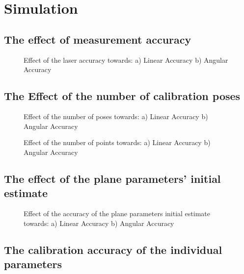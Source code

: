 \section{Simulation}
\label{sec:simulation}


\subsection{The effect of measurement accuracy}
\label{sec:meas_accuracy}

\begin{figure}[h]
  \centering
  \;
  \caption{Effect of the laser accuracy towards: a) Linear Accuracy b) Angular Accuracy} 
  \label{fig:num_of_poses}
\end{figure}





\subsection{The Effect of the number of calibration poses}
\label{sec:calib_poses}

\begin{figure}[h]
  \centering
  \;
  \caption{Effect of the number of poses towards: a) Linear Accuracy b) Angular Accuracy} 
  \label{fig:num_of_poses}
\end{figure}

\begin{figure}[h]
  \centering
  \;
  \caption{Effect of the number of points towards: a) Linear Accuracy b) Angular Accuracy} 
  \label{fig:num_of_points}
\end{figure}





\subsection{The effect of the plane parameters' initial estimate}
\label{sec:plane_params}


\begin{figure}[h]
  \centering
  \;
  \caption{Effect of the accuracy of the plane parameters initial estimate towards: a) Linear Accuracy b) Angular Accuracy} 
  \label{fig:plane_params}
\end{figure}




\subsection{The calibration accuracy of the individual parameters}
\label{sec:individual_params}





